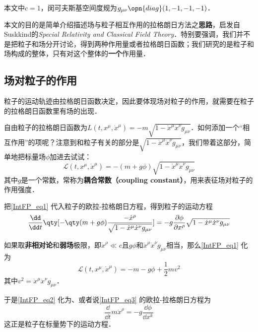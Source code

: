 

本文中$c=1$，闵可夫斯基空间度规为$g_{\mu\nu}\opn{diag}(1, -1, -1, -1)$．

本文的目的是简单介绍描述场与粒子相互作用的拉格朗日方法之\textbf{思路}，启发自Suskkind的\textsl{Special Relativity and Classical Field Theory}\cite{SusskindClassicalFields}．特别要强调，我们并不是把粒子和场分开讨论，得到两种作用量或者拉格朗日函数；我们研究的是粒子和场构成的整体，只有对这个整体的\textbf{一个}作用量．

\subsection{场对粒子的作用}

粒子的运动轨迹由拉格朗日函数决定，因此要体现场对粒子的作用，就需要在粒子的拉格朗日函数里有场的出现．

自由粒子的拉格朗日函数为$L(t, x^\mu, \dot{x}^\mu ) = -m\sqrt{1-\dot{x}^\mu \dot{x}^\nu g_{\mu\nu}}$．如何添加一个“相互作用”的项呢？注意到和粒子有关的部分是$\sqrt{1-\dot{x}^\mu \dot{x}^\nu g_{\mu\nu}}$，我们带着这部分，简单地把标量场$\phi$加进去试试：
\begin{equation}\label{IntFP_eq1}
\mathcal{L}(t, x^\mu, \dot{x}^\mu ) = -(m+g\phi)\sqrt{1-\dot{x}^\mu \dot{x}^\nu g_{\mu\nu}}
\end{equation}
其中$g$是一个常数，常称为\textbf{耦合常数（coupling constant）}，用来表征场对粒子的作用强度．

把\autoref{IntFP_eq1} 代入粒子的欧拉-拉格朗日方程，得到粒子的运动方程
\begin{equation}\label{IntFP_eq2}
\frac{\dd }{\dd t} \qty[-\qty(m+g\phi)\frac{-\dot{x}^\rho}{\sqrt{1-\dot{x}^\mu \dot{x}^\nu g_{\mu\nu}}}] = -g\frac{\partial \phi}{\partial x^\rho}\sqrt{1-\dot{x}^\mu \dot{x}^\nu g_{\mu\nu}}
\end{equation}

如果取\textbf{非相对论}和\textbf{弱场}极限，即$\dot{x}^\rho\ll c$且$g\phi$和$\dot{x}^\mu \dot{x}^\nu g_{\mu\nu}$相当，那么\autoref{IntFP_eq1} 化为
\begin{equation}\label{IntFP_eq3}
\mathcal{L}(t, x^\mu, \dot{x}^\mu ) = -m-g\phi+\frac{1}{2}mv^2
\end{equation}
其中$v^2=\dot{x}^\mu \dot{x}^\nu g_{\mu\nu}$．

于是\autoref{IntFP_eq2} 化为、或者说\autoref{IntFP_eq3} 的欧拉-拉格朗日方程为
\begin{equation}\label{IntFP_eq4}
\frac{\dd}{\dd t} m\dot{x}^\rho = -g\frac{\dd \phi}{\dd x^k}
\end{equation}
这正是粒子在标量势下的运动方程．

